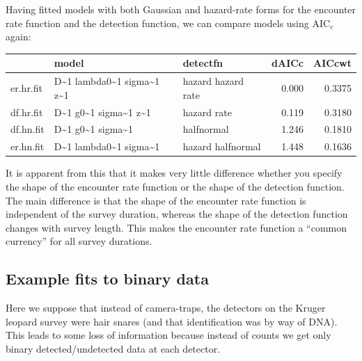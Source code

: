 Having fitted models with both Gaussian and hazard-rate forms for the encounter rate function and the detection function, we can compare models using AIC$_c$ again:
{\small
\begin{knitrout}
\color{fgcolor}\begin{kframe}
\begin{alltt}
 \hlkwb{=} 
\hlopt{::}\hlstd{(aics[,}\hlstd{(}\hlstd{,}\hlstd{,}\hlstd{,}\hlstd{)])}
\end{alltt}
\end{kframe}
\begin{tabular}{l|l|l|r|r}
\hline
  & model & detectfn & dAICc & AICcwt\\
\hline
er.hr.fit & D\textasciitilde{}1 lambda0\textasciitilde{}1 sigma\textasciitilde{}1 z\textasciitilde{}1 & hazard hazard rate & 0.000 & 0.3375\\
\hline
df.hr.fit & D\textasciitilde{}1 g0\textasciitilde{}1 sigma\textasciitilde{}1 z\textasciitilde{}1 & hazard rate & 0.119 & 0.3180\\
\hline
df.hn.fit & D\textasciitilde{}1 g0\textasciitilde{}1 sigma\textasciitilde{}1 & halfnormal & 1.246 & 0.1810\\
\hline
er.hn.fit & D\textasciitilde{}1 lambda0\textasciitilde{}1 sigma\textasciitilde{}1 & hazard halfnormal & 1.448 & 0.1636\\
\hline
\end{tabular}


\end{knitrout}
}
\noindent
It is apparent from this that it makes very little difference whether you specify the shape of the encounter rate function or the shape of the detection function. The main difference is that the shape of the encounter rate function is independent of the survey duration, whereas the shape of the detection function changes with survey length. This makes the encounter rate function a ``common currency'' for all survey durations.

\subsection{Example fits to binary data}

Here we suppose that instead of camera-traps, the detectors on the Kruger leopard survey were hair snares (and that identification was by way of DNA). This leads to some loss of information because instead of counts we get only binary detected/undetected data at each detector.

